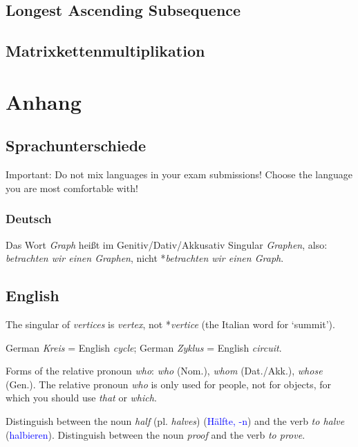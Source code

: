 \documentclass[a4paper]{article}
\begin{document}
\subsection{Longest Ascending Subsequence}

\subsection{Matrixkettenmultiplikation}



\newpage



\newpage
\section{Anhang}
\subsection{Sprachunterschiede}
Important: Do not mix languages in your exam submissions! Choose the language you are most comfortable with!

\subsubsection{Deutsch}

Das Wort \emph{Graph} hei\ss t im Genitiv/Dativ/Akkusativ Singular \emph{Graphen}, also: \emph{betrachten wir einen Graphen}, nicht *\emph{betrachten wir einen Graph}.

\subsection{English}

The singular of \emph{vertices} is \emph{vertex}, not *\emph{vertice} (the Italian word for `summit').

German \emph{Kreis} = English \emph{cycle}; German \emph{Zyklus} = English \emph{circuit}.

Forms of the relative pronoun \emph{who}: \emph{who} (Nom.), \emph{whom} (Dat./Akk.), \emph{whose} (Gen.). The relative pronoun \emph{who} is only used for people, not for objects, for which you should use \emph{that} or \emph{which}.

Distinguish between the noun \emph{half} (pl. \emph{halves}) (\textcolor{blue}{Hälfte, -n}) and the verb \emph{to halve} (\textcolor{blue}{halbieren}). Distinguish between the noun \emph{proof} and the verb \emph{to prove}.
\end{document}
